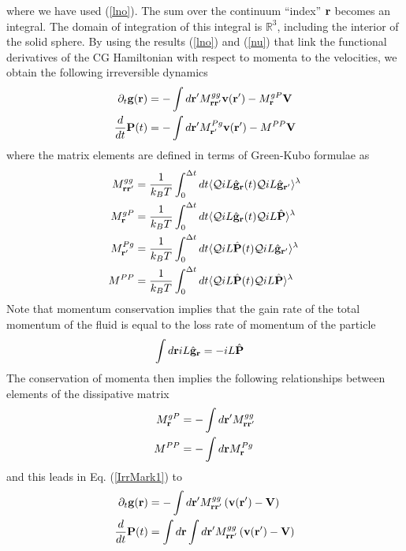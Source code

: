 \documentclass[b5paper,openright,11pt]{book}
\begin{document}
where we have  used (\ref{lno}). The sum over  the continuum ``index''
${\bf  r}$ becomes  an integral.   The domain  of integration  of this
integral  is  $\mathbb{R}^3$,  including  the interior  of  the  solid
sphere. By  using the  results (\ref{lno}) and  (\ref{nu}) that  link the
functional derivatives of  the CG Hamiltonian with  respect to momenta
to the velocities, we obtain the following irreversible dynamics
\begin{align}
  \partial_t{\bf g}({\bf r})&=-\int d{\bf r}'M^{gg}_{{\bf r}{\bf r}'}
{\bf v}({\bf r}')-M^{gP}_{\bf r}{\bf V}
\nonumber\\
\frac{d}{dt}{\bf P}(t)&=-\int d{\bf r}' M^{Pg}_{{\bf r}'}{\bf v}({\bf r}')-M^{PP}{\bf V}
\label{IrrMark1}\end{align}
where the matrix elements are  defined in terms of Green-Kubo formulae
as
\begin{align}
  M^{gg}_{{\bf r}{\bf r}'}&=\frac{1}{k_BT}\int_0^{\Delta t} dt\langle 
{\cal Q}  iL\hat{\bf g}_{{\bf r}}(t){\cal Q}  iL\hat{\bf g}_{{\bf r}'}\rangle^\lambda
\nonumber\\
  M^{gP}_{{\bf r}}&=\frac{1}{k_BT}\int_0^{\Delta t} dt\langle 
{\cal Q}  iL\hat{\bf g}_{\bf r}(t){\cal Q}  iL\hat{\bf P}\rangle^\lambda
\nonumber\\
  M^{Pg}_{{\bf r}'}&=\frac{1}{k_BT}\int_0^{\Delta t} dt\langle 
{\cal Q}  iL\hat{\bf P}(t){\cal Q}  iL\hat{\bf g}_{{\bf r}'}\rangle^\lambda
\nonumber\\
  M^{PP}&=\frac{1}{k_BT}\int_0^{\Delta t} dt\langle 
{\cal Q}  iL\hat{\bf P}(t){\cal Q}  iL\hat{\bf P}\rangle^\lambda
\nonumber\\
\label{Ms}
\end{align}
Note that momentum conservation implies that the gain rate of the total momentum
of the fluid is equal to the loss rate of momentum of the particle
\begin{align}
  \int d{\bf r} iL\hat{\bf g}_{\bf r}&=-iL\hat{\bf P}
\label{iLgiLP}
\end{align}
The conservation of momenta then implies the following relationships between
elements of the dissipative matrix
\begin{align}
M^{gP}_{{\bf r}}&=-\int d{\bf r}'M^{gg}_{{\bf r}{\bf r}'}
\nonumber\\
M^{PP}&= - \int d{\bf r}M^{Pg}_{{\bf r}}
\end{align}
and this leads in Eq. (\ref{IrrMark1}) to 
\begin{align}
  \partial_t{\bf g}({\bf r})&=-\int d{\bf r}'M^{gg}_{{\bf r}{\bf r}'}\left({\bf v}({\bf r}')-{\bf V}\right)
\nonumber\\
\frac{d}{dt}{\bf P}(t)&=\int d{\bf r}\int d{\bf r}'M^{gg}_{{\bf r}{\bf r}'}\left({\bf v}({\bf r}')-{\bf V}\right)
\label{IrrMark2}\end{align}
\end{document}
